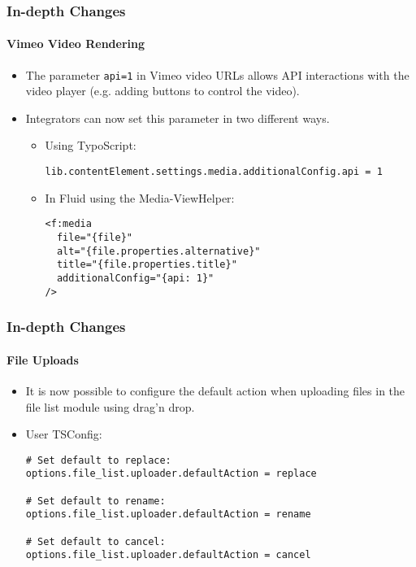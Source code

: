 \begin{frame}[fragile]
	\frametitle{In-depth Changes}
	\framesubtitle{Vimeo Video Rendering}

	\lstset{basicstyle=\smaller\ttfamily}

	\begin{itemize}
		\item The parameter \texttt{api=1} in Vimeo video URLs allows API interactions with the video player (e.g. adding buttons to control the video).
		\item Integrators can now set this parameter in two different ways.

		\begin{itemize}
			\item Using TypoScript:
\begin{lstlisting}
lib.contentElement.settings.media.additionalConfig.api = 1
\end{lstlisting}

			\item In Fluid using the Media-ViewHelper:
\begin{lstlisting}
<f:media
  file="{file}"
  alt="{file.properties.alternative}"
  title="{file.properties.title}"
  additionalConfig="{api: 1}"
/>
\end{lstlisting}

		\end{itemize}
	\end{itemize}

\end{frame}


\begin{frame}[fragile]
	\frametitle{In-depth Changes}
	\framesubtitle{File Uploads}

	\lstset{basicstyle=\smaller\ttfamily}

	\begin{itemize}
		\item It is now possible to configure the default action when uploading files in the file list module using drag'n drop.
		\item User TSConfig:
\begin{lstlisting}
# Set default to replace:
options.file_list.uploader.defaultAction = replace

# Set default to rename:
options.file_list.uploader.defaultAction = rename

# Set default to cancel:
options.file_list.uploader.defaultAction = cancel
\end{lstlisting}

	\end{itemize}

\end{frame}

